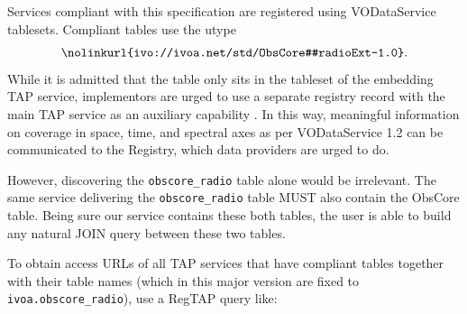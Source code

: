 \documentclass[11pt,a4paper]{ivoa}
\begin{document}
Services compliant with this specification are registered using
VODataService \citep{2021ivoa.spec.1102D} tablesets. 
Compliant tables use the utype
$$ \hbox{\nolinkurl{ivo://ivoa.net/std/ObsCore#radioExt-1.0}.} $$
%
While it is admitted that the table only sits in the tableset of the
embedding TAP service, implementors are urged to use a separate registry
record with the main TAP service as an auxiliary capability
\citep{2019ivoa.spec.0520D}. In this way, meaningful information
on coverage in space, time, and spectral axes as per VODataService 1.2 can
be communicated to the Registry, which data providers are urged
to do.

However, discovering the \verb|obscore_radio| table alone would be  irrelevant. The same service delivering the \verb|obscore_radio| table MUST also contain the ObsCore table.   
Being sure our service  contains these both tables,
the user is able  to  build any natural JOIN query between these two tables. 



To obtain access URLs of all TAP services that have compliant tables
together with their table names (which in this major version are fixed
to \verb|ivoa.obscore_radio|), use a RegTAP \citep{2019ivoa.spec.1011D}
query like:
\end{document}
